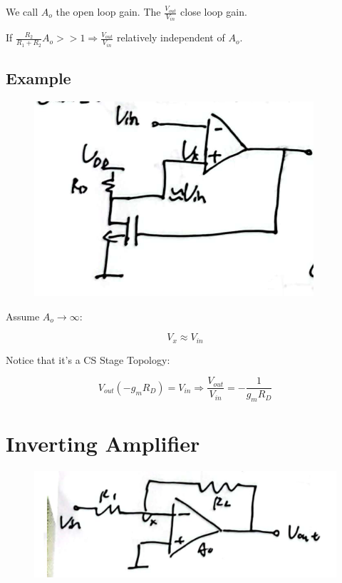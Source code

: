\documentclass[fontset=windows]{article}
\begin{document}
We call $A_o$ the open loop gain. The $\frac{V_{out}}{V_{in}}$ close loop gain. 

If $\frac{R_2}{R_1+R_2}A_o>>1\Longrightarrow \frac{V_{out}}{V_{in}}$ relatively independent of $A_o$. 

\subsection{Example}

\begin{figure}[htbp]
    \centering
    \includegraphics[scale=0.8]{6.jpg}
    \captionsetup{labelformat=empty}
    \caption{}
    \label{6}
\end{figure}

Assume $A_o\to \infty$: 

$$V_x\approx V_{in}$$

Notice that it's a CS Stage Topology:  

$$V_{out}(-g_mR_D)=V_{in}\Longrightarrow \frac{V_{out}}{V_{in}}=-\frac{1}{g_mR_D}$$

\section*{Inverting Amplifier}

\begin{figure}[htbp]
    \centering
    \includegraphics[scale=0.8]{7.jpg}
    \captionsetup{labelformat=empty}
    \caption{}
    \label{7}
\end{figure}
\end{document}
